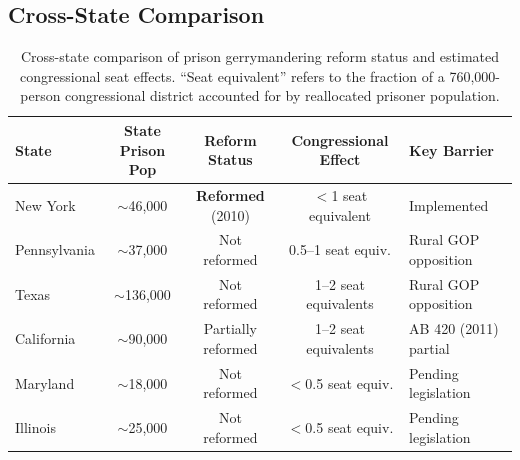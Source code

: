 \subsection{Cross-State Comparison}

\begin{table}[h]
\centering
\begin{tabular}{lcccl}
\toprule
\textbf{State} & \textbf{State Prison Pop} & \textbf{Reform Status} & \textbf{Congressional Effect} & \textbf{Key Barrier} \\
\midrule
New York & $\sim$46,000 & \textbf{Reformed} (2010) & $<$1 seat equivalent & Implemented \\
Pennsylvania & $\sim$37,000 & Not reformed & 0.5--1 seat equiv. & Rural GOP opposition \\
Texas & $\sim$136,000 & Not reformed & 1--2 seat equivalents & Rural GOP opposition \\
\midrule
California & $\sim$90,000 & Partially reformed & 1--2 seat equivalents & AB 420 (2011) partial \\
Maryland & $\sim$18,000 & Not reformed & $<$0.5 seat equiv. & Pending legislation \\
Illinois & $\sim$25,000 & Not reformed & $<$0.5 seat equiv. & Pending legislation \\
\bottomrule
\end{tabular}
\caption{Cross-state comparison of prison gerrymandering reform status and estimated congressional seat effects. ``Seat equivalent'' refers to the fraction of a 760,000-person congressional district accounted for by reallocated prisoner population.}
\label{tab:cross-state}
\end{table}
